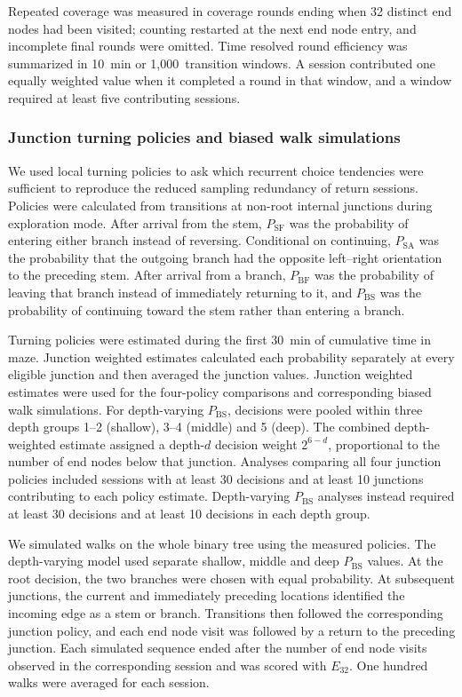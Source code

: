 \documentclass[fleqn,10pt]{wlscirep}
\begin{document}
Repeated coverage was measured in coverage rounds ending when 32 distinct end nodes had been visited; counting restarted at the next end node entry, and incomplete final rounds were omitted. Time resolved round efficiency was summarized in 10~min or 1,000~transition windows. A session contributed one equally weighted value when it completed a round in that window, and a window required at least five contributing sessions. 

\subsubsection*{Junction turning policies and biased walk simulations}

We used local turning policies to ask which recurrent choice tendencies were sufficient to reproduce the reduced sampling redundancy of return sessions. Policies were calculated from transitions at non-root internal junctions during exploration mode. After arrival from the stem, $P_{\mathrm{SF}}$ was the probability of entering either branch instead of reversing. Conditional on continuing, $P_{\mathrm{SA}}$ was the probability that the outgoing branch had the opposite left--right orientation to the preceding stem. After arrival from a branch, $P_{\mathrm{BF}}$ was the probability of leaving that branch instead of immediately returning to it, and $P_{\mathrm{BS}}$ was the probability of continuing toward the stem rather than entering a branch. 

Turning policies were estimated during the first 30~min of cumulative time in maze. Junction weighted estimates calculated each probability separately at every eligible junction and then averaged the junction values. Junction weighted estimates were used for the four-policy comparisons and corresponding biased walk simulations. For depth-varying $P_{\mathrm{BS}}$, decisions were pooled within three depth groups 1--2 (shallow), 3--4 (middle) and 5 (deep). The combined depth-weighted estimate assigned a depth-$d$ decision weight $2^{6-d}$, proportional to the number of end nodes below that junction. Analyses comparing all four junction policies included sessions with at least 30 decisions and at least 10 junctions contributing to each policy estimate. Depth-varying $P_{\mathrm{BS}}$ analyses instead required at least 30 decisions and at least 10 decisions in each depth group.

We simulated walks on the whole binary tree using the measured policies. The depth-varying model used separate shallow, middle and deep $P_{\mathrm{BS}}$ values. At the root decision, the two branches were chosen with equal probability. At subsequent junctions, the current and immediately preceding locations identified the incoming edge as a stem or branch. Transitions then followed the corresponding junction policy, and each end node visit was followed by a return to the preceding junction. Each simulated sequence ended after the number of end node visits observed in the corresponding session and was scored with $E_{32}$. One hundred walks were averaged for each session. 
\end{document}
